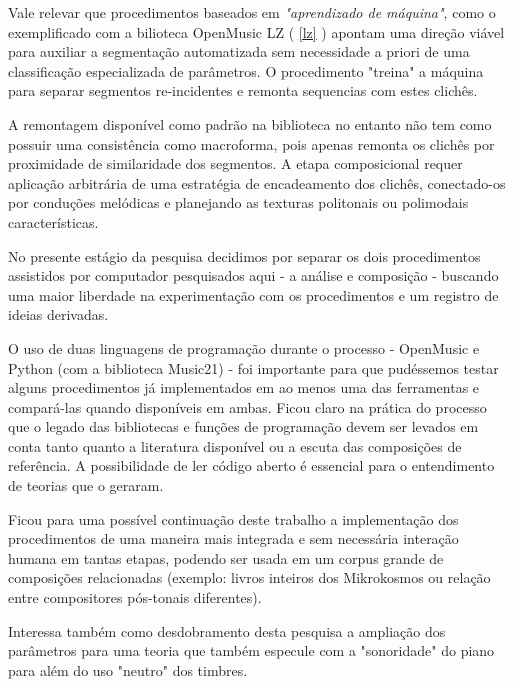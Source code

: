 \documentclass[
	12pt,				%
	openright,			%
	twoside,			%
	a4paper,			%
	english,			%
	french,				%
	spanish,			%
	brazil				%
	]{abntex2}
\begin{document}
Vale relevar que procedimentos baseados em \textit{"aprendizado de máquina"}, como o exemplificado com a bilioteca OpenMusic LZ ( \autoref{lz} ) apontam uma direção viável para auxiliar a segmentação automatizada sem necessidade a priori de uma classificação especializada de parâmetros. O procedimento "treina" a máquina para separar segmentos re-incidentes e remonta sequencias com estes clichês. 

A remontagem disponível como padrão na biblioteca no entanto não tem como possuir uma consistência como macroforma, pois apenas remonta os clichês por proximidade de similaridade dos segmentos.
A etapa composicional requer aplicação arbitrária de uma estratégia de encadeamento dos clichês, conectado-os por conduções melódicas e planejando as texturas politonais ou polimodais características.

No presente estágio da pesquisa decidimos por separar os dois procedimentos assistidos por computador pesquisados aqui - a análise e composição - buscando uma maior liberdade na experimentação com os procedimentos e um registro de ideias derivadas. 

O uso de duas linguagens de programação durante o processo - OpenMusic e Python (com a biblioteca Music21)  - foi importante para que pudéssemos testar alguns procedimentos já implementados em ao menos uma das ferramentas e compará-las quando disponíveis em ambas. Ficou claro na prática do processo que o legado das bibliotecas e funções de programação devem ser levados em conta tanto quanto a literatura disponível ou a escuta das composições de referência. A possibilidade de ler código aberto é essencial para o entendimento de teorias que o geraram.

Ficou para uma possível continuação deste trabalho a implementação dos procedimentos de uma maneira mais integrada e sem necessária interação humana em tantas etapas, podendo ser usada em um corpus grande de composições relacionadas (exemplo: livros inteiros dos Mikrokosmos ou relação entre compositores pós-tonais diferentes). 

Interessa também como desdobramento desta pesquisa a ampliação dos parâmetros para uma teoria que também especule com a "sonoridade"\cite{guigue2012} do piano para além do uso "neutro" dos timbres. 







\postextual
\end{document}
